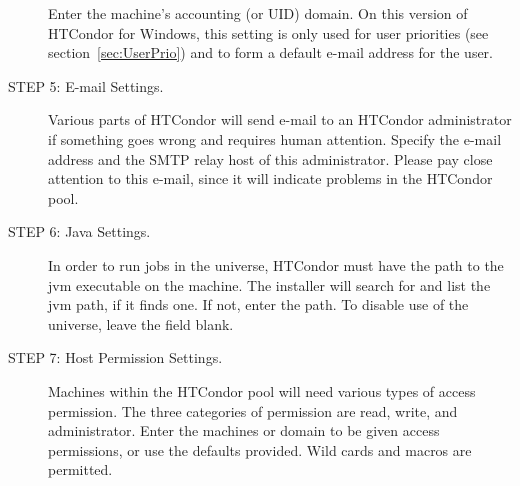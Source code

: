 \begin{description}

     Enter the machine's accounting (or UID) domain.
     On this version of HTCondor for Windows, this setting is only used for user
     priorities (see section~\ref{sec:UserPrio})
     and to form a default e-mail address for
     the user.

\item[STEP 5: E-mail Settings.]

     Various parts of HTCondor will send e-mail to an HTCondor administrator
     if something goes wrong and requires human attention.
     Specify the e-mail address and the SMTP relay host
     of this administrator.  Please pay close attention to this e-mail,
     since it will indicate problems in the HTCondor pool.

\item[STEP 6: Java Settings.]
     In order to run jobs in the  universe,
     HTCondor must have the path to the jvm executable on the machine.
     The installer will search for and list the jvm path, if it finds one.
     If not, enter the path.
     To disable use of the  universe,
     leave the field blank.

\item[STEP 7: Host Permission Settings.]
     Machines within the HTCondor pool will need various types of 
     access permission. 
     The three categories of permission are read, write, and administrator.
     Enter the machines or domain to be given access permissions,
     or use the defaults provided.
     Wild cards and macros are permitted.


\end{description}
